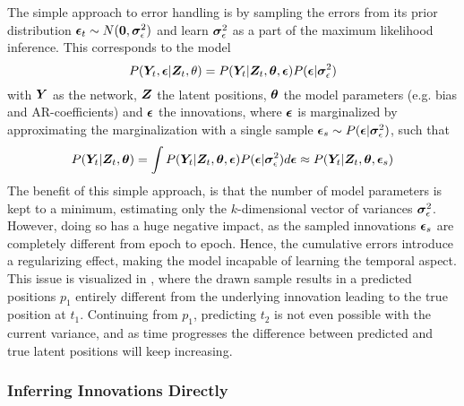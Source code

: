         The simple approach to error handling is by sampling the errors from its prior distribution $\bm{\epsilon}_t \sim N(\bm{0},\bm{\sigma}_\epsilon^2)$ and learn $\bm{\sigma}_\epsilon^2$ as a part of the maximum likelihood inference.
        This corresponds to the model
        \begin{equation}
            P(\bm{Y}_t,\bm{\epsilon}|\bm{Z}_t,\theta) = P(\bm{Y}_t|\bm{Z}_t,\bm{\theta},\bm{\epsilon})P(\bm{\epsilon}|\bm{\sigma}_\epsilon^2)
        \end{equation}
        with $\bm{Y}$ as the network, $\bm{Z}$ the latent positions, $\bm{\theta}$ the model parameters (e.g. bias and AR-coefficients) and $\bm{\epsilon}$ the innovations, where $\bm{\epsilon}$ is marginalized by approximating the marginalization with a single sample $\bm{\epsilon}_s \sim P(\bm{\epsilon}|\bm{\sigma}_\epsilon^2)$, such that
        \begin{equation}
            P(\bm{Y}_t|\bm{Z}_t,\bm{\theta}) = \int P(\bm{Y}_t|\bm{Z}_t,\bm{\theta},\bm{\epsilon}) P(\bm{\epsilon}|\bm{\sigma}_\epsilon^2) d\bm{\epsilon} \approx P(\bm{Y}_t|\bm{Z}_t,\bm{\theta},\bm{\epsilon}_s)
        \end{equation}
        The benefit of this simple approach, is that the number of model parameters is kept to a minimum, estimating only the $k$-dimensional vector of variances $\bm{\sigma}_\epsilon^2$. However, doing so has a huge negative impact, as the sampled innovations $\bm{\epsilon}_s$ are completely different from epoch to epoch. Hence, the cumulative errors introduce a regularizing effect, making the model incapable of learning the temporal aspect. This issue is visualized in , where the drawn sample results in a predicted positions $p_1$ entirely different from the underlying innovation leading to the true position at $t_1$. 
        Continuing from $p_1$, predicting $t_2$ is not even possible with the current variance, and as time progresses the difference between predicted and true latent positions will keep increasing.
    
    \subsubsection{Inferring Innovations Directly}

